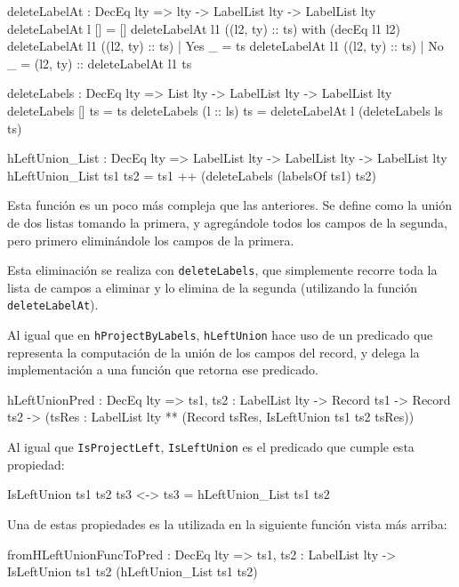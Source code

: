 \begin{code}
deleteLabelAt : DecEq lty => lty -> LabelList lty ->
  LabelList lty
deleteLabelAt l [] = []
deleteLabelAt l1 ((l2, ty) :: ts) with (decEq l1 l2)
  deleteLabelAt l1 ((l2, ty) :: ts) | Yes _ = ts
  deleteLabelAt l1 ((l2, ty) :: ts) | No _ =
    (l2, ty) :: deleteLabelAt l1 ts

deleteLabels : DecEq lty => List lty -> LabelList lty ->
  LabelList lty
deleteLabels [] ts = ts
deleteLabels (l :: ls) ts =
  deleteLabelAt l (deleteLabels ls ts)

hLeftUnion_List : DecEq lty => LabelList lty ->
  LabelList lty -> LabelList lty
hLeftUnion_List ts1 ts2 =
  ts1 ++ (deleteLabels (labelsOf ts1) ts2)
\end{code}

Esta función es un poco más compleja que las anteriores. Se define como la unión de dos listas tomando la primera, y agregándole todos los campos de la segunda, pero primero eliminándole los campos de la primera.

Esta eliminación se realiza con \texttt{deleteLabels}, que simplemente recorre toda la lista de campos a eliminar y lo elimina de la segunda (utilizando la función \texttt{deleteLabelAt}).

Al igual que en \texttt{hProjectByLabels}, \texttt{hLeftUnion} hace uso de un predicado que representa la computación de la unión de los campos del record, y delega la implementación a una función que retorna ese predicado.

\begin{code}
hLeftUnionPred : DecEq lty => {ts1, ts2 : LabelList lty} ->
  Record ts1 -> Record ts2 ->
  (tsRes : LabelList lty ** (Record tsRes,
    IsLeftUnion ts1 ts2 tsRes))
\end{code}

Al igual que \texttt{IsProjectLeft}, \texttt{IsLeftUnion} es el predicado que cumple esta propiedad:

\begin{code}
IsLeftUnion ts1 ts2 ts3 <-> ts3 = hLeftUnion_List ts1 ts2
\end{code}

Una de estas propiedades es la utilizada en la siguiente función vista más arriba:

\begin{code}
fromHLeftUnionFuncToPred : DecEq lty =>
  {ts1, ts2 : LabelList lty} ->
  IsLeftUnion ts1 ts2 (hLeftUnion_List ts1 ts2)
\end{code}

